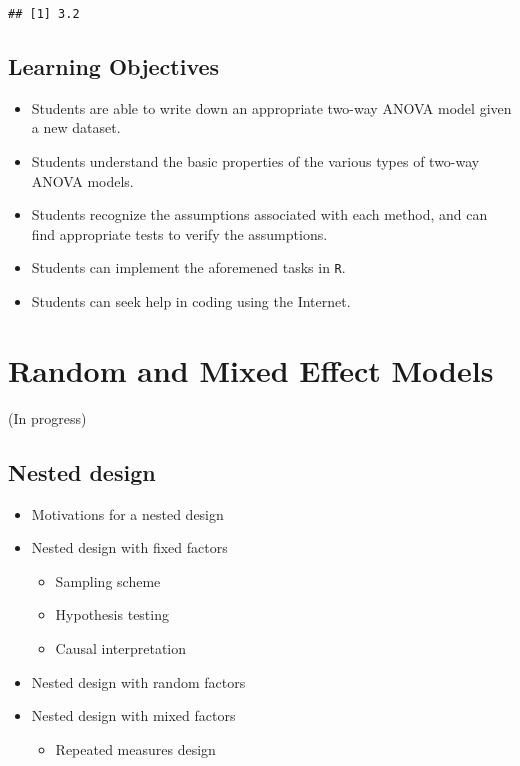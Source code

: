 \documentclass[12pt,]{book}
\providecommand{\tightlist}{%
  \setlength{\itemsep}{0pt}\setlength{\parskip}{0pt}}
\begin{document}
\begin{verbatim}
## [1] 3.2
\end{verbatim}

\section{Learning Objectives}\label{learning-objectives-2}

\begin{itemize}
\tightlist
\item
  Students are able to write down an appropriate two-way ANOVA model
  given a new dataset.
\item
  Students understand the basic properties of the various types of
  two-way ANOVA models.
\item
  Students recognize the assumptions associated with each method, and
  can find appropriate tests to verify the assumptions.
\item
  Students can implement the aforemened tasks in \texttt{R}.
\item
  Students can seek help in coding using the Internet.
\end{itemize}

\chapter{Random and Mixed Effect Models}\label{ch:nested}

(In progress)

\section{Nested design}\label{nested-design}

\begin{itemize}
\tightlist
\item
  Motivations for a nested design
\item
  Nested design with fixed factors

  \begin{itemize}
  \tightlist
  \item
    Sampling scheme
  \item
    Hypothesis testing
  \item
    Causal interpretation
  \end{itemize}
\item
  Nested design with random factors
\item
  Nested design with mixed factors

  \begin{itemize}
  \tightlist
  \item
    Repeated measures design
  \end{itemize}
\end{itemize}
\end{document}
